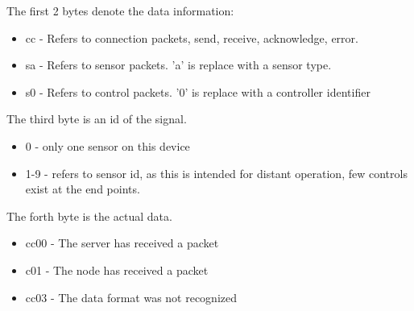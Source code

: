 \documentclass[]{report}
\begin{document}
	The first 2 bytes denote the data information:
	\begin{itemize}
		\item cc - Refers to connection packets, send, receive, acknowledge, error.
		\item sa - Refers to sensor packets. 'a' is replace with a sensor type.
		\item s0 - Refers to control packets. '0' is replace with a controller identifier
	\end{itemize}	
	The third byte is an id of the signal.
	\begin{itemize}
		\item 0 - only one sensor on this device
		\item 1-9 - refers to sensor id, as this is intended for distant operation, few controls exist at the end points.
	\end{itemize}
	The forth byte is the actual data.
	\begin{itemize}
		\item cc00 - The server has received a packet
		\item c01 - The node has received a packet
		\item cc03 - The data format was not recognized  
	\end{itemize}
	
\end{document}
